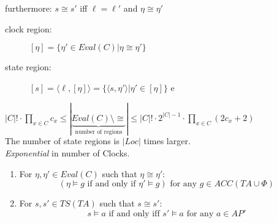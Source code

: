 \documentclass[a4paper, 10pt]{article}
\begin{document}
\begin{mdframed}
\begin{center}
\scalebox{1}{}
\end{center}
furthermore: $s\cong s'$ iff $\ell=\ell'$ and $\eta\cong\eta'$
\begin{description}
    \item[clock region:] $[\eta]=\{\eta'\in Eval(C) | \eta\cong\eta'\}$
    \item[state region:] $[s]=\langle\ell,[\eta]\rangle = \{\langle s,\eta'\rangle | \eta'\in[\eta]\}$ e
\end{description}
$|C|!\cdot\prod_{x\in C} c_x\leq | \underset{\text{number of regions}}{\underbrace{Eval(C)\setminus\cong}} | \leq |C|!\cdot 2^{|C|-1} \cdot \prod_{x\in C} (2c_x+2)$ \\
The number of state regions is $|Loc|$ times larger. \\
\emph{Exponential} in number of Clocks.
\begin{enumerate}
    \item For $\eta,\eta'\in Eval(C)$ such that $\eta\cong\eta'$:
    \[ (\eta\models g \text{ if and only if } \eta'\models g) \text{ for any } g \in ACC(TA\cup\Phi) \]
    \item For $s,s'\in TS(TA)$ such that $s\cong s'$:
    \[ s\models a \text{ if and only iff } s'\models a \text{ for any } a\in AP' \]
\end{enumerate}
\end{mdframed}
\end{document}
